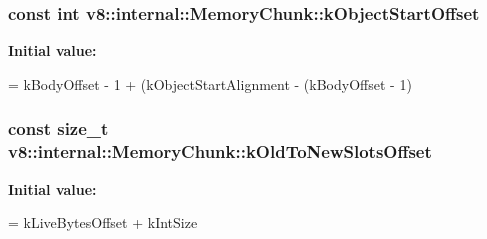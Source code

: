 \subsubsection[{\texorpdfstring{k\+Object\+Start\+Offset}{kObjectStartOffset}}]{\setlength{\rightskip}{0pt plus 5cm}const int v8\+::internal\+::\+Memory\+Chunk\+::k\+Object\+Start\+Offset\hspace{0.3cm}{\ttfamily [static]}}\hypertarget{classv8_1_1internal_1_1_memory_chunk_a323d49bf8af911559723fa084503b6e7}{}\label{classv8_1_1internal_1_1_memory_chunk_a323d49bf8af911559723fa084503b6e7}
{\bfseries Initial value\+:}
\begin{DoxyCode}
=
      kBodyOffset - 1 +
      (kObjectStartAlignment - (kBodyOffset - 1) %
\end{DoxyCode}
\subsubsection[{\texorpdfstring{k\+Old\+To\+New\+Slots\+Offset}{kOldToNewSlotsOffset}}]{\setlength{\rightskip}{0pt plus 5cm}const size\+\_\+t v8\+::internal\+::\+Memory\+Chunk\+::k\+Old\+To\+New\+Slots\+Offset\hspace{0.3cm}{\ttfamily [static]}}\hypertarget{classv8_1_1internal_1_1_memory_chunk_a40b70fb3dc220c199c2edf00fef9a92b}{}\label{classv8_1_1internal_1_1_memory_chunk_a40b70fb3dc220c199c2edf00fef9a92b}
{\bfseries Initial value\+:}
\begin{DoxyCode}
=
      kLiveBytesOffset + kIntSize
\end{DoxyCode}
